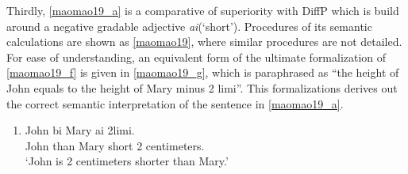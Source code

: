 \documentclass{ctexart}
\begin{document}
Thirdly, \ref{maomao19_a} is a comparative of superiority with DiffP which is build around a negative gradable adjective \textit{ai}(`short'). Procedures of its semantic calculations are shown as \ref{maomao19}, where similar procedures are not detailed. For ease of understanding, an equivalent form of the ultimate formalization of \ref{maomao19_f} is given in \ref{maomao19_g}, which is paraphrased as ``the height of John equals to the height of Mary minus 2 limi''. This formalizations derives out the correct semantic interpretation of the sentence in \ref{maomao19_a}.

\begin{enumerate}
    \item \label{maomao19_a}
    John bi \enspace \enspace Mary \enspace ai \enspace \enspace \enspace \enspace \enspace 2limi. \\
    John than Mary short 2 centimeters. \\
    `John is 2 centimeters shorter than Mary.'
\end{enumerate}
\end{document}
